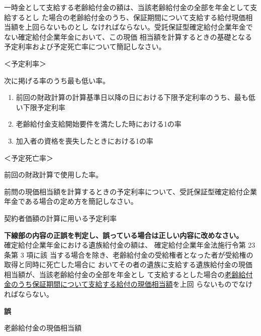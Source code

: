 \begin{shortanswer}[年金1 2019 問題2(3)\textcircled{1}]
  一時金として支給する老齢給付金の額は、当該老齢給付金の全部を年金として支給するとし
た場合の老齢給付金のうち、保証期間について支給する給付現価相当額を上回らないものとし
なければならない。受託保証型確定給付企業年金でない確定給付企業年金において、この現価
相当額を計算するときの基礎となる予定利率および予定死亡率について簡記しなさい。
\end{shortanswer}

\begin{answerbox}
  ＜予定利率＞

次に掲げる率のうち最も低い率。
\begin{enumerate}
  \item 前回の財政計算の計算基準日以降の日における下限予定利率のうち、最も低い下限予定利率
  \item 老齢給付金支給開始要件を満たした時における1の率
  \item 加入者の資格を喪失したときにおける1の率
\end{enumerate}

＜予定死亡率＞

前回の財政計算で使用した率。
\end{answerbox}

\begin{shortanswer}[自作 2026/10/11]
  前問の現価相当額を計算するときの予定利率について、受託保証型確定給付企業年金である場合の定め方を簡記しなさい。
\end{shortanswer}

\begin{answerbox}
  契約者価額の計算に用いる予定利率
\end{answerbox}

\begin{truefalse}[年金1 H28 問題1(5)\textcircled{4}]
    \textbf{下線部の内容の正誤を判定し、誤っている場合は正しい内容に改めなさい。}
  \\  

  確定給付企業年金における遺族給付金の額は、 確定給付企業年金法施行令第 23 条第 3 項に該
当する場合を除き、老齢給付金の受給権者となった者が受給権の取得と同時に死亡した場合に
おいてその者の遺族に支給する遺族給付金の現価相当額が、当該老齢給付金の全部を年金とし
て支給するとした場合の\underline{老齢給付金のうち保証期間について支給する給付の現価相当額}を上回
らないものでなければならない。
\end{truefalse}

\begin{answerbox}
\textbf{誤}

  老齢給付金の現価相当額
\end{answerbox}

